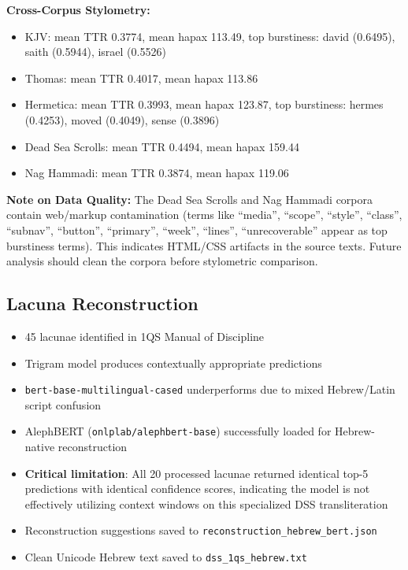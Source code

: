 \documentclass[11pt]{article}
\begin{document}
\textbf{Cross-Corpus Stylometry:}
\begin{itemize}
    \item KJV: mean TTR 0.3774, mean hapax 113.49, top burstiness: david (0.6495), saith (0.5944), israel (0.5526)
    \item Thomas: mean TTR 0.4017, mean hapax 113.86
    \item Hermetica: mean TTR 0.3993, mean hapax 123.87, top burstiness: hermes (0.4253), moved (0.4049), sense (0.3896)
    \item Dead Sea Scrolls: mean TTR 0.4494, mean hapax 159.44
    \item Nag Hammadi: mean TTR 0.3874, mean hapax 119.06
\end{itemize}

\textbf{Note on Data Quality:} The Dead Sea Scrolls and Nag Hammadi corpora contain web/markup contamination (terms like ``media'', ``scope'', ``style'', ``class'', ``subnav'', ``button'', ``primary'', ``week'', ``lines'', ``unrecoverable'' appear as top burstiness terms). This indicates HTML/CSS artifacts in the source texts. Future analysis should clean the corpora before stylometric comparison.

\subsection{Lacuna Reconstruction}

\begin{itemize}
    \item 45 lacunae identified in 1QS Manual of Discipline
    \item Trigram model produces contextually appropriate predictions
    \item \texttt{bert-base-multilingual-cased} underperforms due to mixed Hebrew/Latin script confusion
    \item AlephBERT (\texttt{onlplab/alephbert-base}) successfully loaded for Hebrew-native reconstruction
    \item \textbf{Critical limitation}: All 20 processed lacunae returned identical top-5 predictions with identical confidence scores, indicating the model is not effectively utilizing context windows on this specialized DSS transliteration
    \item Reconstruction suggestions saved to \texttt{reconstruction\_hebrew\_bert.json}
    \item Clean Unicode Hebrew text saved to \texttt{dss\_1qs\_hebrew.txt}
\end{itemize}
\end{document}

